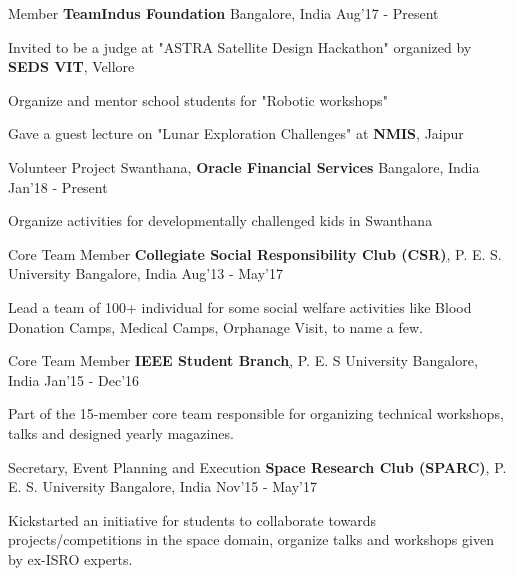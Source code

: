 \begin{cventries}
	\cventry
	{Member}
	{\textbf{TeamIndus Foundation}}
	{Bangalore, India}
	{Aug'17 - Present}
	{
		\begin{cvitems}
		\item{Invited to be a judge at "ASTRA Satellite Design Hackathon" organized by \textbf{SEDS VIT}, Vellore}
		\item{Organize and mentor school students for "Robotic workshops"}
		\item{Gave a guest lecture on "Lunar Exploration Challenges" at \textbf{NMIS}, Jaipur}
		\end{cvitems}
	}
	\cventry
	{Volunteer}
	{Project Swanthana, \textbf{Oracle Financial Services}}
	{Bangalore, India}
	{Jan'18 - Present}
	{
		\begin{cvitems}
		\item{Organize activities for developmentally challenged kids in Swanthana}
		\end{cvitems}
	}

	\cventry
	{Core Team Member}
	{\textbf{Collegiate Social Responsibility Club (CSR)}\href{http://pes.edu/clubs/pes-csr-club/}, P. E. S. University}
	{Bangalore, India}
	{Aug'13 - May'17}
	{
		\begin{cvitems}
		\item{Lead a team of 100+ individual for some social welfare activities like Blood Donation Camps, Medical Camps, Orphanage Visit, to name a few.}
		\end{cvitems}
	}

	\cventry
	{Core Team Member}
	{\textbf{IEEE Student Branch}\href{http://ieee.pes.edu/}, P. E. S University}
	{Bangalore, India}
	{Jan'15 - Dec'16}
	{
		\begin{cvitems}
		\item{Part of the 15-member core team responsible for organizing technical workshops, talks and designed yearly magazines.}
		\end{cvitems}
	}

	\cventry
	{Secretary, Event Planning and Execution}
	{\textbf{Space Research Club (SPARC)}\href{https://www.facebook.com/Space-Research-Club-Of-PES-University-487153011445398/?tn-str=k*F}, P. E. S. University}
	{Bangalore, India}
	{Nov'15 - May'17}
	{
		\begin{cvitems}
		\item{Kickstarted an initiative for students to collaborate towards projects/competitions in the space domain, organize talks and workshops given by ex-ISRO experts.}
		\end{cvitems}
	}


\end{cventries}
